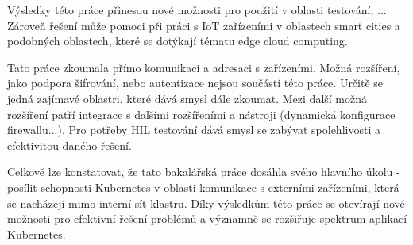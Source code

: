 \bigskip

Výsledky této práce přinesou nové možnosti pro použití v oblasti testování, ... Zároveň řešení může pomoci při práci s IoT zařízeními v oblastech smart cities a podobných oblastech, které se dotýkají tématu edge cloud computing.

Tato práce zkoumala přímo komunikaci a adresaci s zařízeními. Možná rozšíření, jako podpora šifrování, nebo autentizace nejsou součástí této práce. Určitě se jedná zajímavé oblastri, které dává smysl dále zkoumat. Mezi další možná rozšíření patří integrace s dalšími rozšířeními a nástroji (dynamická konfigurace firewallu...). Pro potřeby HIL testování dává smysl se zabývat spolehlivosti a efektivitou daného řešení.

Celkově lze konstatovat, že tato bakalářská práce dosáhla svého hlavního úkolu - posílit schopnosti Kubernetes v oblasti komunikace s externími zařízeními, která se nacházejí mimo interní síť klastru. Díky výsledkům této práce se otevírají nové možnosti pro efektivní řešení problémů a významně se rozšiřuje spektrum aplikací Kubernetes.
